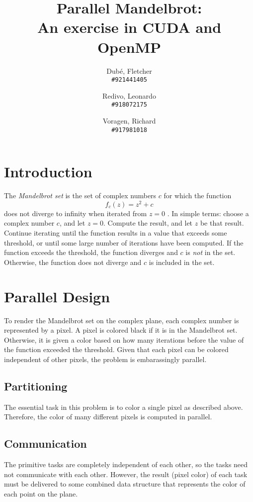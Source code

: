 \documentclass{article}
\author{
	Dub\'e, Fletcher\\
	\texttt{\#921441405}
	\and
	Redivo, Leonardo\\
	\texttt{\#918072175}
	\and
	Voragen, Richard\\
	\texttt{\#917981018}
}
\title{Parallel Mandelbrot: \\An exercise in CUDA and OpenMP}
\begin{document}
\maketitle

\section{Introduction} \label{sec:intro}
    The \emph{Mandelbrot set} is the set of complex numbers $c$ for which the function
    \begin{equation} \label{eq:mandelbrot}
    f_c(z) = z^2 + c
    \end{equation}
    does not diverge to infinity when iterated from $z = 0$ \cite{mandel_wiki}. In simple terms: choose a complex number $c$, and let $z = 0$. Compute the result, and let $z$ be that result. Continue iterating until the function results in a value that exceeds some threshold, or until some large number of iterations have been computed. If the function exceeds the threshold, the function diverges and $c$ is \emph{not} in the set. Otherwise, the function does not diverge and $c$ is included in the set.

\section{Parallel Design}
    To render the Mandelbrot set on the complex plane, each complex number is represented by a pixel. A pixel is colored black if it is in the Mandelbrot set. Otherwise, it is given a color based on how many iterations before the value of the function exceeded the threshold. Given that each pixel can be colored independent of other pixels, the problem is embarassingly parallel.

    \subsection{Partitioning}
        The essential task in this problem is to color a single pixel as described above. Therefore, the color of many different pixels is computed in parallel.

    \subsection{Communication}
        The primitive tasks are completely independent of each other, so the tasks need not communicate with each other. However, the result (pixel color) of each task must be delivered to some combined data structure that represents the color of each point on the plane.
\end{document}
